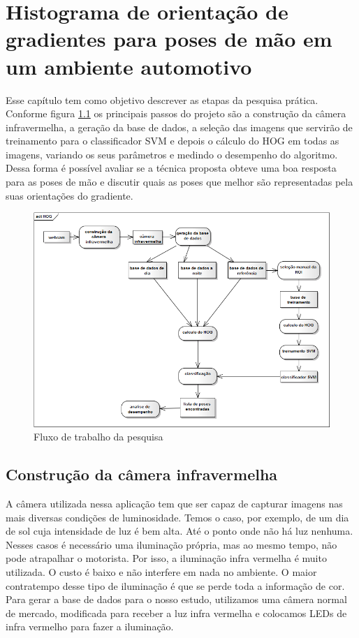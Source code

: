 \chapter{Histograma de orientação de gradientes para poses de mão em um ambiente automotivo}

Esse capítulo tem como objetivo descrever as etapas da pesquisa prática. Conforme figura \ref{fig:research_steps} os principais passos do projeto são a construção da câmera infravermelha, a geração da base de dados, a seleção das imagens que servirão de treinamento para o classificador SVM e depois o cálculo do HOG em todas as imagens, variando os seus parâmetros e medindo o desempenho do algoritmo. Dessa forma é possível avaliar se a técnica proposta obteve uma boa resposta para as poses de mão e discutir quais as poses que melhor são representadas pela suas orientações do gradiente.

\begin{figure}[ht!]
	\centering
  	\includegraphics[scale=0.6]{image/HOG.png}
  	\caption{Fluxo de trabalho da pesquisa}
  	\label{fig:research_steps}
\end{figure}

\section{Construção da câmera infravermelha}

A câmera utilizada nessa aplicação tem que ser capaz de capturar imagens nas mais diversas condições de luminosidade. Temos o caso, por exemplo, de um dia de sol cuja intensidade de luz é bem alta. Até o ponto onde não há luz nenhuma.
Nesses casos é necessário uma iluminação própria, mas ao mesmo tempo, não pode atrapalhar o motorista. Por isso, a iluminação infra vermelha é muito utilizada. O custo é baixo e não interfere em nada no ambiente. O maior contratempo desse tipo de iluminação é que se perde toda a informação de cor.
Para gerar a base de dados para o nosso estudo, utilizamos uma câmera normal de mercado, modificada para receber a luz infra vermelha e colocamos LEDs de infra vermelho para fazer a iluminação.

